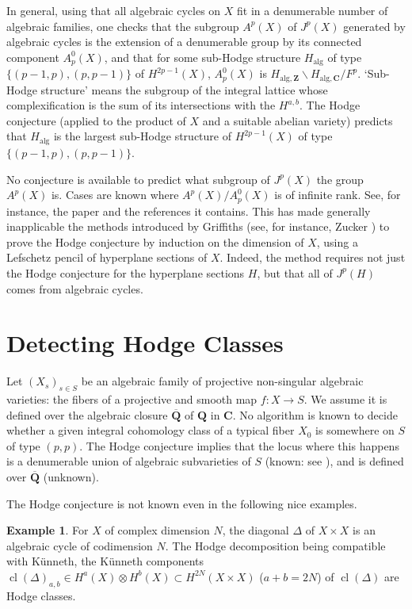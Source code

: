 \documentclass[11pt,a4paper]{article}
\theoremstyle{plain}
\theoremstyle{definition}
\newtheorem{example}[theorem]{Example}
\DeclareMathOperator{\cl}{cl}
\begin{document}
In general, using that all algebraic cycles on $X$ fit in a denumerable number of algebraic families, one checks that the subgroup $A^{p}(X)$ of $J^{p}(X)$ generated by algebraic cycles is the extension of a denumerable group by its connected component $A^{0}_{p}(X)$, and that for some sub-Hodge structure $H_{\text{alg}}$ of type $\{(p-1,p), (p,p-1)\}$ of $H^{2p-1}(X)$, $A^{0}_{p}(X)$ is $H_{\text{alg},\mathbf{Z}} \backslash H_{\text{alg},\mathbf{C}} / F^{p}$. `Sub-Hodge structure' means the subgroup of the integral lattice whose complexification is the sum of its intersections with the $H^{a,b}$. The Hodge conjecture (applied to the product of $X$ and a suitable abelian variety) predicts that $H_{\text{alg}}$ is the largest sub-Hodge structure of $H^{2p-1}(X)$ of type $\{(p-1,p),(p,p-1)\}$.

No conjecture is available to predict what subgroup of $J^{p}(X)$ the group $A^{p}(X)$ is. Cases are known where $A^{p}(X)/A^{0}_{p}(X)$ is of infinite rank. See, for instance, the paper \cite{voisin2000} and the references it contains. This has made generally inapplicable the methods introduced by Griffiths (see, for instance, Zucker \cite{zucker1977}) to prove the Hodge conjecture by induction on the dimension of $X$, using a Lefschetz pencil of hyperplane sections of $X$. Indeed, the method requires not just the Hodge conjecture for the hyperplane sections $H$, but that all of $J^{p}(H)$ comes from algebraic cycles.

\section{Detecting Hodge Classes}

Let $(X_{s})_{s \in S}$ be an algebraic family of projective non-singular algebraic varieties: the fibers of a projective and smooth map $f : X \to S$. We assume it is defined over the algebraic closure $\overline{\mathbf{Q}}$ of $\mathbf{Q}$ in $\mathbf{C}$. No algorithm is known to decide whether a given integral cohomology class of a typical fiber $X_{0}$ is somewhere on $S$ of type $(p,p)$. The Hodge conjecture implies that the locus where this happens is a denumerable union of algebraic subvarieties of $S$ (known: see \cite{cattani-deligne-kaplan1995}), and is defined over $\overline{\mathbf{Q}}$ (unknown).

The Hodge conjecture is not known even in the following nice examples.

\begin{example}
For $X$ of complex dimension $N$, the diagonal $\Delta$ of $X \times X$ is an algebraic cycle of codimension $N$. The Hodge decomposition being compatible with K\"unneth, the K\"unneth components $\cl(\Delta)_{a,b} \in H^{a}(X) \otimes H^{b}(X) \subset H^{2N}(X \times X)$ ($a+b=2N$) of $\cl(\Delta)$ are Hodge classes.
\end{example}
\end{document}

